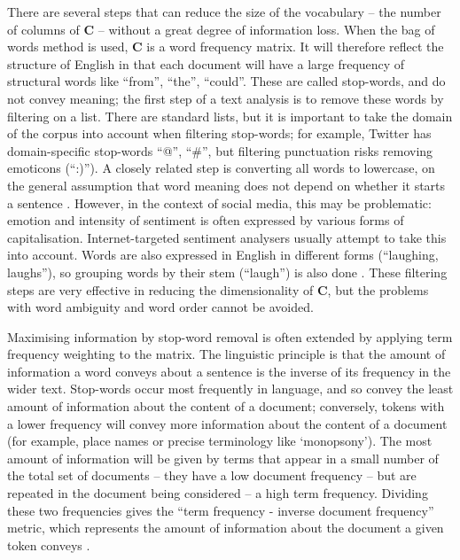 \documentclass{article}
\begin{document}
There are several steps that can reduce the size of the vocabulary -- the number of columns of \(\mathbf{C}\) -- without a great degree of information loss. When the bag of words method is used, \(\mathbf{C}\) is a word frequency matrix. It will therefore reflect the structure of English in that each document will have a large frequency of structural words like ``from'', ``the'', ``could''. These are called stop-words, and do not convey meaning; the first step of a text analysis is to remove these words by filtering on a list. There are standard lists, but it is important to take the domain of the corpus into account when filtering stop-words; for example, Twitter has domain-specific stop-words ``@'', ``\#'', but filtering punctuation risks removing emoticons (``:)''). A closely related step is converting all words to lowercase, on the general assumption that word meaning does not depend on whether it starts a sentence \parencite{dennyTextPreprocessingUnsupervised2018}. However, in the context of social media, this may be problematic: emotion and intensity of sentiment is often expressed by various forms of capitalisation. Internet-targeted sentiment analysers usually attempt to take this into account. Words are also expressed in English in different forms (``laughing, laughs''), so grouping words by their stem (``laugh'') is also done \parencite{porterAlgorithmSuffixStripping1980}. These filtering steps are very effective in reducing the dimensionality of \(\mathbf{C}\), but the problems with word ambiguity and word order cannot be avoided.  

Maximising information by stop-word removal is often extended by applying term frequency weighting to the matrix. The linguistic principle is that the amount of information a word conveys about a sentence is the inverse of its frequency in the wider text. Stop-words occur most frequently in language, and so convey the least amount of information about the content of a document; conversely, tokens with a lower frequency will convey more information about the content of a document (for example, place names or precise terminology like `monopsony'). The most amount of information will be given by terms that appear in a small number of the total set of documents -- they have a low document frequency -- but are repeated in the document being considered -- a high term frequency. Dividing these two frequencies gives the ``term frequency - inverse document frequency'' metric, which represents the amount of information about the document a given token conveys \parencite[100]{manningIntroductionInformationRetrieval2008}.
\end{document}
